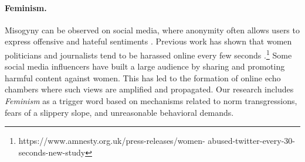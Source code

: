 \paragraph{Feminism.} Misogyny can be observed on social media, where anonymity often allows users to express offensive and hateful sentiments \cite{barker2019online}. Previous work has shown that women politicians and journalists tend to be harassed online every few seconds \cite{posetti2022chilling}.\footnote{https://www.amnesty.org.uk/press-releases/women- abused-twitter-every-30-seconds-new-study
}
Some social media influencers have built a large audience by sharing and promoting harmful content against women. This has led to the formation of online echo chambers \cite{farrell2019exploring} where such views are amplified and propagated. Our research includes \textit{Feminism} as a trigger word based on mechanisms related to norm transgressions, fears of a slippery slope, and unreasonable behavioral demands. 


\begin{table}[]
\caption{Subreddits selected for each trigger word. }
\label{tab:keywords_subreddits}
\end{table}

